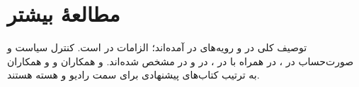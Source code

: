 \documentclass[11pt,a4paper]{article}
\begin{document}
\section{مطالعهٔ بیشتر}
توصیف کلی  در \cite{ts36300} و رویه‌های  در \cite{ts23401} آمده‌اند؛ الزامات
 در \cite{tr25913} است. کنترل سیاست و صورت‌حساب در \cite{ts23203}،  در \cite{ts23214}
همراه با  در \cite{ts29244}،  در \cite{ts23272} و  در \cite{ts23216}
مشخص شده‌اند.  و همکاران \cite{sesia2011lte} و  و همکاران \cite{olsson2013epc} به ترتیب
کتاب‌های پیشنهادی برای سمت رادیو و هسته هستند.

\begin{latin}
\printbibliography[heading=subbibliography,title={References}]
\end{latin}
\end{document}
